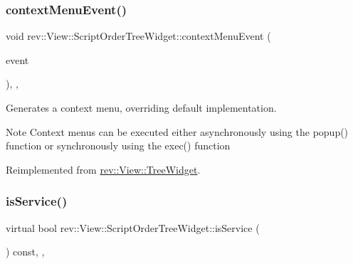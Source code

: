 \mbox{\label{classrev_1_1_view_1_1_script_order_tree_widget_a0a4a2b3e4181c650d3843f3b80bf3b14}} 
\subsubsection{\texorpdfstring{contextMenuEvent()}{contextMenuEvent()}}
{\footnotesize\ttfamily void rev\+::\+View\+::\+Script\+Order\+Tree\+Widget\+::context\+Menu\+Event (\begin{DoxyParamCaption}\item[{Q\+Context\+Menu\+Event $\ast$}]{event }\end{DoxyParamCaption})\hspace{0.3cm}{\ttfamily [override]}, {\ttfamily [protected]}, {\ttfamily [virtual]}}



Generates a context menu, overriding default implementation. 

\begin{DoxyNote}{Note}
Context menus can be executed either asynchronously using the popup() function or synchronously using the exec() function 
\end{DoxyNote}


Reimplemented from \mbox{\hyperlink{classrev_1_1_view_1_1_tree_widget_a47fe709b7b08a5d327a66d091e64820b}{rev\+::\+View\+::\+Tree\+Widget}}.

\mbox{\label{classrev_1_1_view_1_1_script_order_tree_widget_a3aaea671c375bfb363c9a324eccdecee}} 
\subsubsection{\texorpdfstring{isService()}{isService()}}
{\footnotesize\ttfamily virtual bool rev\+::\+View\+::\+Script\+Order\+Tree\+Widget\+::is\+Service (\begin{DoxyParamCaption}{ }\end{DoxyParamCaption}) const\hspace{0.3cm}{\ttfamily [inline]}, {\ttfamily [override]}, {\ttfamily [virtual]}}



